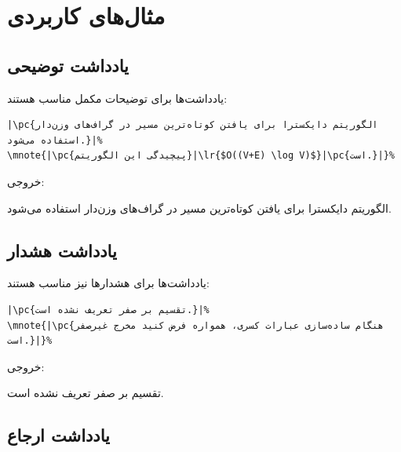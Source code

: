 
\section{مثال‌های کاربردی}
\label{sec:margin-notes-examples}

\subsection{یادداشت توضیحی}
\label{sec:margin-notes-example-explanation}

یادداشت‌ها برای توضیحات مکمل مناسب هستند:

\begin{latin}
\begin{verbatim}
|\pc{الگوریتم دایکسترا برای یافتن کوتاه‌ترین مسیر در گراف‌های وزن‌دار استفاده می‌شود.}|%
\mnote{|\pc{پیچیدگی این الگوریتم}|\lr{$O((V+E) \log V)$}|\pc{است.}|}%
\end{verbatim}
\end{latin}

خروجی:

الگوریتم دایکسترا برای یافتن کوتاه‌ترین مسیر در
گراف‌های وزن‌دار استفاده می‌شود.

\subsection{یادداشت هشدار}
\label{sec:margin-notes-example-warning}

یادداشت‌ها برای هشدارها نیز مناسب هستند:

\begin{latin}
\begin{verbatim}
|\pc{تقسیم بر صفر تعریف نشده است.}|%
\mnote{|\pc{هنگام ساده‌سازی عبارات کسری، همواره فرض کنید مخرج غیرصفر است.}|}%
\end{verbatim}
\end{latin}

خروجی:

تقسیم بر صفر تعریف نشده است.

\subsection{یادداشت ارجاع}
\label{sec:margin-notes-example-reference}

